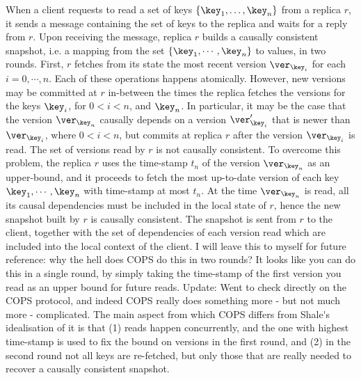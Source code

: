 When a client requests to read a set of keys \( \{\key_1, \dots,
\key_n\} \) from a  replica $r$, it sends a message 
containing the set of keys to the replica and  waits for a reply from $r$. Upon receiving the message, replica $r$ builds a causally consistent snapshot, i.e. 
a mapping from the set $\{\key_{1},\cdots, \key_{n}\}$ to values, in two rounds. 
First, $r$ fetches from its state 
the most recent version \( \ver_{\key_i} \) for each $i
=0,\cdots,n$. Each of these operations happens atomically. However, 
new versions may be committed at $r$ in-between the times the replica fetches the versions for the keys 
$\key_{i}$, for $0 < i < n$,  and $\key_{n}$. In particular, it may be the case that the version $\ver_{\key_{n}}$ causally depends 
on a version $\ver'_{\key_{i}}$ that is newer than $\ver_{\key_{i}}$,  where $0 < i < n$, but commits at replica $r$ 
after the version $\ver_{\key_{i}}$ is read. The set of versions read by $r$ is not causally consistent. 
To overcome this problem, the replica $r$ uses the time-stamp $t_{n}$ of the version $\ver_{\key_{n}}$ as an upper-bound, 
and it proceeds to fetch the most up-to-date version of each key $\key_{1}, \cdots, \key_{n}$ with time-stamp 
at most $t_{n}$. At the time $\ver_{\key_{n}}$ is read,  all its causal dependencies must be included in the local 
state of $r$, hence the new snapshot built by $r$ is causally consistent. The snapshot is sent  from $r$ 
to the client, together with the set of dependencies of each version
read which are 
included into the local context of the client.
\ac{I will leave this to myself for future reference: why the hell does COPS do this in two rounds? It looks like you can do 
this in a single round, by simply taking the time-stamp of the first version you read as an upper bound for future reads.
Update: Went to check directly on the COPS protocol, and indeed COPS really does something more - but not much more - complicated. 
The main aspect from which COPS differs from Shale's idealisation of it is that (1) reads happen concurrently, and the 
one with highest time-stamp is used to fix the bound on versions in the first round, and (2) in the second round not all keys 
are re-fetched, but only those that are really needed to recover a causally consistent snapshot.}

